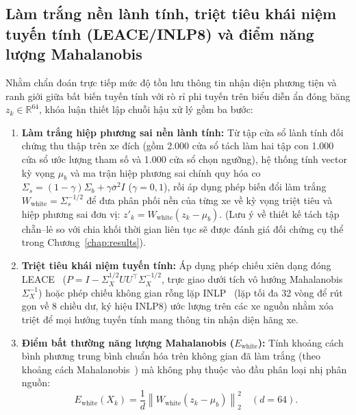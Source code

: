 \documentclass[12pt, a4paper, reqno, oneside]{book}
\begin{document}
\subsection{Làm trắng nền lành tính, triệt tiêu khái niệm tuyến tính (LEACE/INLP8) và điểm năng lượng Mahalanobis}\label{subsec:method-whitening}
Nhằm chẩn đoán trực tiếp mức độ tồn lưu thông tin nhận diện phương tiện và ranh giới giữa bất biến tuyến tính với rò rỉ phi tuyến trên biểu diễn ẩn đóng băng $z_k \in \mathbb{R}^{64}$, khóa luận thiết lập chuỗi hậu xử lý gồm ba bước:
\begin{enumerate}
    \item \textbf{Làm trắng hiệp phương sai nền lành tính:} Từ tập cửa sổ lành tính đối chứng thu thập trên xe đích (gồm 2.000 cửa sổ tách làm hai tập con 1.000 cửa sổ ước lượng tham số và 1.000 cửa sổ chọn ngưỡng), hệ thống tính vector kỳ vọng $\mu_b$ và ma trận hiệp phương sai chính quy hóa co $\Sigma_s = (1 - \gamma)\Sigma_b + \gamma\bar{\sigma}^2 I$ ($\gamma = 0{,}1$), rồi áp dụng phép biến đổi làm trắng $W_{\text{white}} = \Sigma_s^{-1/2}$ để đưa phân phối nền của từng xe về kỳ vọng triệt tiêu và hiệp phương sai đơn vị: $z'_k = W_{\text{white}}(z_k - \mu_b)$. (Lưu ý về thiết kế tách tập chẵn--lẻ so với chia khối thời gian liên tục sẽ được đánh giá đối chứng cụ thể trong Chương~\ref{chap:results}).
    \item \textbf{Triệt tiêu khái niệm tuyến tính:} Áp dụng phép chiếu xiên dạng đóng LEACE~\cite{belrose2023leace} ($P = I - \Sigma_X^{1/2}UU^\top \Sigma_X^{-1/2}$, trực giao dưới tích vô hướng Mahalanobis $\Sigma_X^{-1}$) hoặc phép chiếu không gian rỗng lặp INLP~\cite{ravfogel2020null} (lặp tối đa 32 vòng để rút gọn về 8 chiều dư, ký hiệu INLP8) ước lượng trên các xe nguồn nhằm xóa triệt để mọi hướng tuyến tính mang thông tin nhận diện hãng xe.
    \item \textbf{Điểm bất thường năng lượng Mahalanobis ($E_{\text{white}}$):} Tính khoảng cách bình phương trung bình chuẩn hóa trên không gian đã làm trắng (theo khoảng cách Mahalanobis~\cite{lee2018mahalanobis}) mà không phụ thuộc vào đầu phân loại nhị phân nguồn:
    \begin{equation}
    E_{\text{white}}(X_k) = \frac{1}{d}\left\|W_{\text{white}}(z_k - \mu_b)\right\|_2^2 \quad (d = 64).
    \end{equation}
\end{enumerate}
\end{document}

